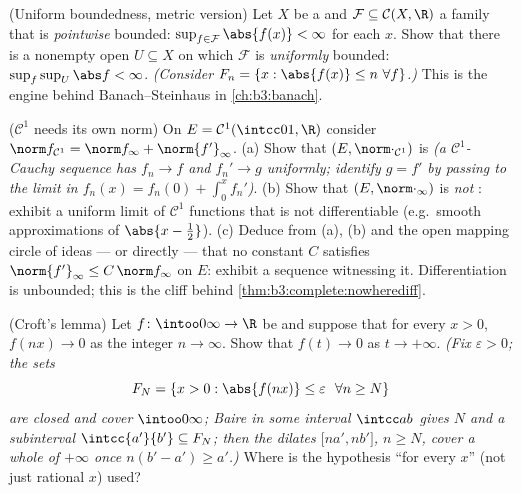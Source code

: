 \begin{exercise}[$\star\star\star$]\label{exo:b3:complete:10}
(Uniform boundedness, metric version) Let $X$ be a  and $\mathcal F \subseteq \mathcal C(X, \R)$ a
family that is \emph{pointwise} bounded: $\sup_{f \in \mathcal
F}\abs{f(x)} < \infty$ for each $x$. Show that there is a
nonempty open $U \subseteq X$ on which $\mathcal F$ is
\emph{uniformly} bounded: $\sup_{f}\sup_U \abs f < \infty$.
\emph{(Consider $F_n = \{x : \abs{f(x)} \leq n\ \forall f\}$.)}
This is the engine behind Banach--Steinhaus in
\cref{ch:b3:banach}.
\end{exercise}

\begin{exercise}[$\star\star$]\label{exo:b3:complete:11}
($\mathcal C^1$ needs its own norm) On $E = \mathcal
C^1(\intcc01, \R)$ consider $\norm f_{\mathcal C^1} = \norm
f_\infty + \norm{f'}_\infty$.
(a) Show that $(E, \norm\cdot_{\mathcal C^1})$ is 
\emph{(a $\mathcal C^1$-Cauchy sequence has $f_n \to f$ and
$f_n' \to g$ uniformly; identify $g = f'$ by passing to the
limit in $f_n(x) = f_n(0) + \int_0^xf_n'$)}.
(b) Show that $(E, \norm\cdot_\infty)$ is \emph{not}
: exhibit a uniform limit of $\mathcal C^1$ functions
that is not differentiable (e.g.\ smooth approximations of
$\abs{x - \tfrac12}$).
(c) Deduce from (a), (b) and the open mapping circle of ideas
--- or directly --- that no constant $C$ satisfies
$\norm{f'}_\infty \leq C\,\norm f_\infty$ on $E$: exhibit a
sequence witnessing it. Differentiation is unbounded; this is
the cliff behind \cref{thm:b3:complete:nowherediff}.
\end{exercise}

\begin{exercise}[$\star\star\star$]\label{exo:b3:complete:12}
(Croft's lemma) Let $f\colon\intoo0\infty\to\R$ be 
and suppose that for every $x > 0$, $f(nx) \to 0$ as the
integer $n \to \infty$. Show that $f(t) \to 0$ as $t \to
+\infty$. \emph{(Fix $\varepsilon > 0$; the sets
\[
F_N = \{x > 0 : \abs{f(nx)} \leq \varepsilon\ \ \forall n
\geq N\}
\]
are closed and cover $\intoo0\infty$; Baire in some interval
$\intcc ab$ gives $N$ and a subinterval $\intcc{a'}{b'}
\subseteq F_N$; then the dilates $\bigl[na', nb'\bigr]$, $n
\geq N$, cover a whole  of $+\infty$ once
$n(b' - a') \geq a'$.)} Where is the hypothesis ``for every
$x$'' (not just rational $x$) used?
\end{exercise}

